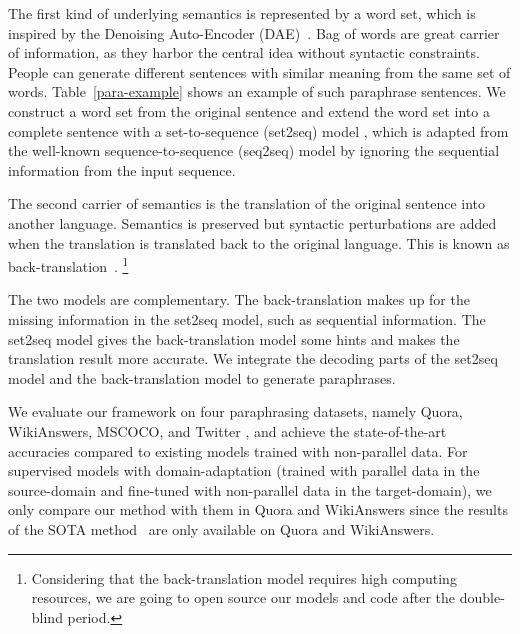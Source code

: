 The first kind of underlying semantics is represented by a word set, 
which is inspired by the Denoising Auto-Encoder (DAE)~\citet{denoisingAE}. 
Bag of words are great carrier of information, 
as they harbor the central idea without syntactic constraints. 
People can generate different sentences with similar meaning from the same 
set of words. Table~\ref{para-example} shows an example of such 
paraphrase sentences. We construct a word set from the 
original sentence and extend the word set into a complete sentence 
with a set-to-sequence (set2seq) model 
, 
which is adapted from the well-known sequence-to-sequence (seq2seq) model by ignoring the sequential information from the input sequence.

The second carrier of semantics is the translation of the 
original sentence into another language. 
Semantics is preserved but syntactic perturbations are added 
when the translation is translated back to the 
original language. This is known as back-translation~\citep{wieting2017paranmt}. 
\footnote{Considering that the back-translation model requires high computing resources, we are going to open source our models and code after the double-blind period.}

 
The two models are complementary. The back-translation makes up for the missing information in the set2seq model, such as sequential information. The set2seq model gives the back-translation model some hints and makes the translation result more accurate. We integrate the decoding parts of the set2seq model and 
the back-translation model to generate paraphrases.

We evaluate our framework on four paraphrasing datasets, namely Quora, WikiAnswers, MSCOCO, and Twitter \citep{lan2017continuously}, and achieve the state-of-the-art accuracies compared to existing models trained with non-parallel data. For supervised models with domain-adaptation (trained with parallel data in the source-domain and fine-tuned with non-parallel data in the target-domain), we only compare our method with them in Quora and WikiAnswers since the results of the SOTA method~\citep{li2019decomposable} are only 
available on Quora and WikiAnswers.

